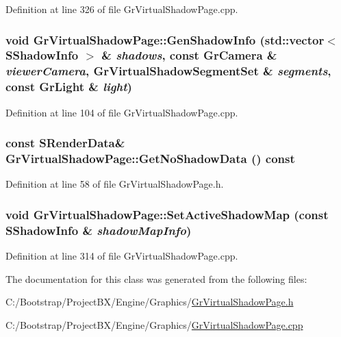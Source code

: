 Definition at line 326 of file GrVirtualShadowPage.cpp.\hypertarget{class_gr_virtual_shadow_page_47d88b2d5752b7a1e2f38d14d5df538d}{
\subsubsection[{GenShadowInfo}]{\setlength{\rightskip}{0pt plus 5cm}void GrVirtualShadowPage::GenShadowInfo (std::vector$<$ {\bf SShadowInfo} $>$ \& {\em shadows}, \/  const {\bf GrCamera} \& {\em viewerCamera}, \/  {\bf GrVirtualShadowSegmentSet} \& {\em segments}, \/  const {\bf GrLight} \& {\em light})}}
\label{class_gr_virtual_shadow_page_47d88b2d5752b7a1e2f38d14d5df538d}




Definition at line 104 of file GrVirtualShadowPage.cpp.\hypertarget{class_gr_virtual_shadow_page_23f6fa9b0a66272dcc951413faafaf09}{
\subsubsection[{GetNoShadowData}]{\setlength{\rightskip}{0pt plus 5cm}const {\bf SRenderData}\& GrVirtualShadowPage::GetNoShadowData () const}}
\label{class_gr_virtual_shadow_page_23f6fa9b0a66272dcc951413faafaf09}




Definition at line 58 of file GrVirtualShadowPage.h.\hypertarget{class_gr_virtual_shadow_page_e438a2c1b4140e1c7a12b1c1628d2040}{
\subsubsection[{SetActiveShadowMap}]{\setlength{\rightskip}{0pt plus 5cm}void GrVirtualShadowPage::SetActiveShadowMap (const {\bf SShadowInfo} \& {\em shadowMapInfo})}}
\label{class_gr_virtual_shadow_page_e438a2c1b4140e1c7a12b1c1628d2040}




Definition at line 314 of file GrVirtualShadowPage.cpp.

The documentation for this class was generated from the following files:\begin{CompactItemize}
\item 
C:/Bootstrap/ProjectBX/Engine/Graphics/\hyperlink{_gr_virtual_shadow_page_8h}{GrVirtualShadowPage.h}\item 
C:/Bootstrap/ProjectBX/Engine/Graphics/\hyperlink{_gr_virtual_shadow_page_8cpp}{GrVirtualShadowPage.cpp}\end{CompactItemize}
